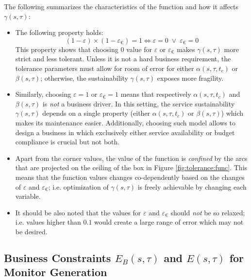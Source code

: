 The following summarizes the characteristics of the function and how it affects $\gamma(s,\tau)$:
\begin{itemize}
\item The following property holds:
\[
(1-\varepsilon) \times (1-\varepsilon_{\euro}) = 1 \iff \varepsilon = 0 \;\lor\; \varepsilon_{\euro} = 0
\]
This property shows that choosing $0$ value for $\varepsilon$ or $\varepsilon_{\euro}$ makes $\gamma(s,\tau)$ more strict and less tolerant. 
Unless it is not a hard business requirement, the tolerance parameters must allow for room of error for either $\alpha(s,\tau,t_c)$ or $\beta(s,\tau)$; otherwise, the sustainability $\gamma(s,\tau)$ exposes more fragility.
\item Similarly, choosing $\varepsilon = 1$ or $\varepsilon_{\euro} = 1$ means that respectively $\alpha(s,\tau,t_c)$ and $\beta(s,\tau)$ is \emph{not} a business driver.
In this setting, the service sustainability $\gamma(s,\tau)$ depends on a single property (either $\alpha(s,\tau,t_c)$ or $\beta(s,\tau)$) which makes its maintenance easier.
Additionally, choosing such model allows to design a business in which exclusively either service availability or budget compliance is crucial but not both.
\item Apart from the corner values, the value of the function is \emph{confined} by the arcs that are projected on the ceiling of the box in Figure \ref{fig:tolerance:func}.
This means that the function values changes co-dependently based on the changes of $\varepsilon$ and $\varepsilon_{\euro}$; i.e. optimization of $\gamma(s,\tau)$ is freely achievable by changing each variable.
\item It should be also noted that the values for $\varepsilon$ and $\varepsilon_{\euro}$ should \emph{not} be so relaxed; 
i.e. values higher than $0.1$ would create a large range of error which may not be desired.
\end{itemize}


\subsection{Business Constraints $E_B(s,\tau)$ and $E(s,\tau)$ for Monitor Generation}

